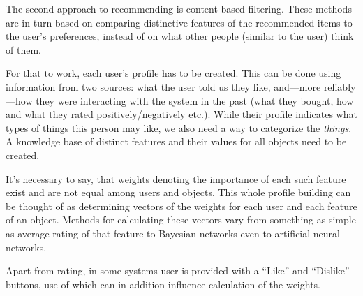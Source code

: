 The second approach to recommending is content-based filtering. These methods are in turn based on comparing distinctive features of the recommended items to the user's preferences, instead of on what other people (similar to the user) think of them.

For that to work, each user's profile has to be created. This can be done using information from two sources: what the user told us they like, and---more reliably---how they were interacting with the system in the past (what they bought, how and what they rated positively/negatively etc.). While their profile indicates what types of things this person may like, we also need a way to categorize the \emph{things}. A knowledge base of distinct features and their values for all objects need to be created.

It's necessary to say, that weights denoting the importance of each such feature exist and are not equal among users and objects. This whole profile building can be thought of as determining vectors of the weights for each user and each feature of an object. Methods for calculating these vectors vary from something as simple as average rating of that feature to Bayesian networks even to artificial neural networks.

Apart from rating, in some systems user is provided with a ``Like'' and ``Dislike'' buttons, use of which can in addition influence calculation of the weights.

